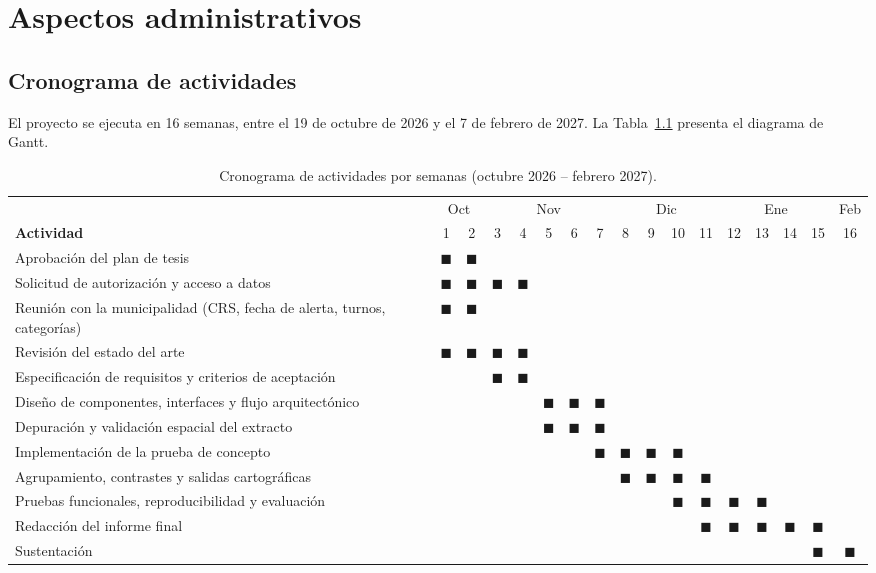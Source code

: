 \chapter{Aspectos administrativos}

\section{Cronograma de actividades}

El proyecto se ejecuta en 16 semanas, entre el 19 de octubre de 2026 y el 7 de febrero de 2027. La Tabla~\ref{tab:cronograma} presenta el diagrama de Gantt.

\begin{table}[H]
\centering
\caption{Cronograma de actividades por semanas (octubre 2026 -- febrero 2027).}
\label{tab:cronograma}
\begingroup\singlespacing\scriptsize
\setlength{\tabcolsep}{2.2pt}
\newcommand{\x}{$\blacksquare$}
\begin{tabular}{@{}>{\raggedright\arraybackslash}p{5.2cm}*{16}{c}@{}}
\toprule
 & \multicolumn{2}{c}{Oct} & \multicolumn{5}{c}{Nov} & \multicolumn{4}{c}{Dic} & \multicolumn{4}{c}{Ene} & Feb \\
\textbf{Actividad} & 1 & 2 & 3 & 4 & 5 & 6 & 7 & 8 & 9 & 10 & 11 & 12 & 13 & 14 & 15 & 16 \\
\midrule
Aprobación del plan de tesis & \x & \x & & & & & & & & & & & & & & \\
Solicitud de autorización y acceso a datos & \x & \x & \x & \x & & & & & & & & & & & & \\
Reunión con la municipalidad (CRS, fecha de alerta, turnos, categorías) & \x & \x & & & & & & & & & & & & & & \\
Revisión del estado del arte & \x & \x & \x & \x & & & & & & & & & & & & \\
Especificación de requisitos y criterios de aceptación & & & \x & \x & & & & & & & & & & & & \\
Diseño de componentes, interfaces y flujo arquitectónico & & & & & \x & \x & \x & & & & & & & & & \\
Depuración y validación espacial del extracto & & & & & \x & \x & \x & & & & & & & & & \\
Implementación de la prueba de concepto & & & & & & & \x & \x & \x & \x & & & & & & \\
Agrupamiento, contrastes y salidas cartográficas & & & & & & & & \x & \x & \x & \x & & & & & \\
Pruebas funcionales, reproducibilidad y evaluación & & & & & & & & & & \x & \x & \x & \x & & & \\
Redacción del informe final & & & & & & & & & & & \x & \x & \x & \x & \x & \\
Sustentación & & & & & & & & & & & & & & & \x & \x \\
\bottomrule
\end{tabular}
\endgroup
{}
\end{table}

